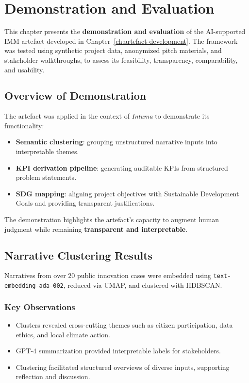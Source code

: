 \chapter{Demonstration and Evaluation}\label{ch:demonstration-evaluation}

This chapter presents the \textbf{demonstration and evaluation} of the AI-supported IMM artefact developed in Chapter~\ref{ch:artefact-development}. 
The framework was tested using synthetic project data, anonymized pitch materials, and stakeholder walkthroughs, to assess its feasibility, transparency, comparability, and usability.

\section{Overview of Demonstration}\label{sec:demo-overview}

The artefact was applied in the context of \textit{Inluma} to demonstrate its functionality:

\begin{itemize}
    \item \textbf{Semantic clustering}: grouping unstructured narrative inputs into interpretable themes.
    \item \textbf{KPI derivation pipeline}: generating auditable KPIs from structured problem statements.
    \item \textbf{SDG mapping}: aligning project objectives with Sustainable Development Goals and providing transparent justifications.
\end{itemize}

The demonstration highlights the artefact's capacity to augment human judgment while remaining \textbf{transparent and interpretable}.

\section{Narrative Clustering Results}\label{sec:results-clustering}

Narratives from over 20 public innovation cases were embedded using \texttt{text-embedding-ada-002}, reduced via UMAP, and clustered with HDBSCAN.

\subsection*{Key Observations}

\begin{itemize}
    \item Clusters revealed cross-cutting themes such as citizen participation, data ethics, and local climate action.  
    \item GPT-4 summarization provided interpretable labels for stakeholders.  
    \item Clustering facilitated structured overviews of diverse inputs, supporting reflection and discussion.  
\end{itemize}

